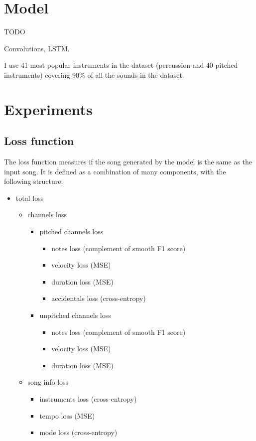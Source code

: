 \documentclass[en]{pracamgr}
\begin{document}
\chapter{Model}

TODO

Convolutions, LSTM.

I use 41 most popular instruments in the dataset (percussion and 40 pitched instruments) covering 90\% of all the sounds in the dataset.

\chapter{Experiments}

\section{Loss function}

The loss function measures if the song generated by the model is the same as the input song. It is defined as a combination of many components, with the following structure:
\begin{itemize}
\item total loss
	\begin{itemize}
	\item channels loss
		\begin{itemize}
			\item pitched channels loss
				\begin{itemize}
					\item notes loss (complement of smooth F1 score)
					\item velocity loss (MSE)
					\item duration loss (MSE)
					\item accidentals loss (cross-entropy)
				\end{itemize}
			\item unpitched channels loss
				\begin{itemize}
					\item notes loss (complement of smooth F1 score)
					\item velocity loss (MSE)
					\item duration loss (MSE)
				\end{itemize}
		\end{itemize}
	\item song info loss
		\begin{itemize}
			\item instruments loss (cross-entropy)
			\item tempo loss (MSE)
			\item mode loss (cross-entropy)
		\end{itemize}
	\end{itemize}
\end{itemize}
\end{document}

